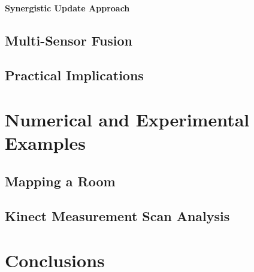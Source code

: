\paragraph{Synergistic Update Approach}

\subsection{Multi-Sensor Fusion}

\subsection{Practical Implications}

\section{Numerical and Experimental Examples}

\subsection{Mapping a Room}

\subsection{Kinect Measurement Scan Analysis}


\section{Conclusions}

